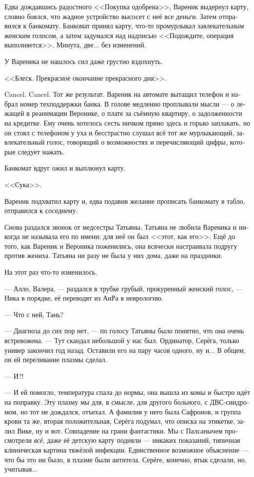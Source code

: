 \documentclass[a5paper,12pt,fleqn]{extbook}\usepackage{cooltooltips}\usepackage{polyglossia}\setdefaultlanguage[babelshorthands=true]{russian}\setotherlanguage{english}\defaultfontfeatures{Ligatures=TeX,Mapping=tex-text} \usepackage{xcolor}\definecolor{lightgray}{HTML}{bbbbbb}\color{lightgray}\newcommand{\ml}[3]{\textenglish{\textcolor{black}{#3}}}
\newcommand{\asterism}{\vspace{1em}{\centering\Large\bfseries$\ast~\ast~\ast$\par}\vspace{1em}}
\newcommand{\textspace}{\vspace{1em}{\centering\Large\bfseries<...>\par}\vspace{1em}}
\begin{document}
Едва дождавшись радостного <<Покупка одобрена>>, Вареник выдернул карту, словно боялся, что жадное устройство высосет с неё все деньги.
Затем отправился к банкомату.
Банкомат принял карту, что-то промурлыкал завлекательным женским голосом, а затем задумался над надписью <<Подождите, операция выполняется>>.
Минута, две... без изменений.

У Вареника не нашлось сил даже грустно вздохнуть.

<<Блеск.
Прекрасное окончание прекрасного дня>>.

Cancel.
Cancel.
Тот же результат.
Вареник на автомате вытащил телефон и набрал номер техподдержки банка.
В голове медленно проплывали мысли --- о лежащей в реанимации Веронике, о плате за съёмную квартиру, о задолженности на кредитке.
Ему очень хотелось сесть ничком прямо здесь и горько заплакать, но он стоял с телефоном у уха и бесстрастно слушал всё тот же мурлыкающий, завлекательный голос, говорящий о возможностях и перечисляющий цифры, которые следует нажать.

Банкомат вдруг ожил и выплюнул карту.

<<Сука>>.

Вареник подхватил карту и, едва подавив желание прописать банкомату в табло, отправился к соседнему.

\asterism

\textspace

Снова раздался звонок от медсестры Татьяны.
Татьяна не любила Вареника и никогда не называла его по имени;
для неё он был <<этот, как его>>.
Ещё до того, как Вареник и Вероника поженились, она всячески настраивала подругу против жениха.
Татьяна ни разу не была у них дома, даже на праздники.

На этот раз что-то изменилось.

--- Алло, Валера, --- раздался в трубке грубый, прокуренный женский голос, --- Ника в порядке, её переводят из АиРа в неврологию.

--- Что с ней, Тань?

--- Диагноза до сих пор нет, --- по голосу Татьяны было понятно, что она очень встревожена.
--- Тут скандал небольшой у нас был.
Ординатор, Серёга, только универ закончил год назад.
Оставили его на пару часов одного, ну и...
В общем, он ей переливание плазмы сделал.

--- И?!

--- И ей помогло, температура спала до нормы, она вышла из комы и быстро идёт на поправку.
Эту плазму мы для, в смысле, для другого больного, с ДВС-синдромом, но тот не дождался, отъехал.
А фамилия у него была Сафронов, и группа крови та же, вторая положительная, Серёга подумал, что описка на этикетке, залил Вике, ну и вот.
Совпадение на грани фантастики.
Мы с Палсанычем просмотрели \emph{всё}, даже её детскую карту подняли --- никаких показаний, типичная клиническая картина тяжёлой инфекции.
Единственное возможное объяснение --- что бы это ни было, в плазме были антитела.
Серёге, конечно, втык сделали, но, учитывая...
\end{document}
